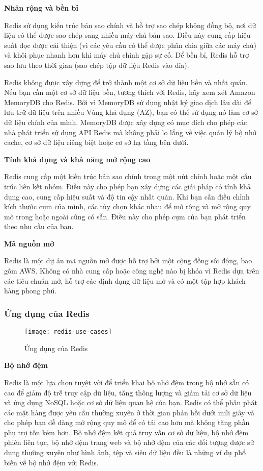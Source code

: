 \textbf{Nhân rộng và bền bỉ}

Redis sử dụng kiến trúc bản sao chính và hỗ trợ sao chép không đồng bộ, nơi dữ liệu có thể được sao chép sang nhiều máy chủ bản sao. Điều này cung cấp hiệu suất đọc được cải thiện (vì các yêu cầu có thể được phân chia giữa các máy chủ) và khôi phục nhanh hơn khi máy chủ chính gặp sự cố. Để bền bỉ, Redis hỗ trợ sao lưu theo thời gian (sao chép tập dữ liệu Redis vào đĩa).

Redis không được xây dựng để trở thành một cơ sở dữ liệu bền và nhất quán. Nếu bạn cần một cơ sở dữ liệu bền, tương thích với Redis, hãy xem xét Amazon MemoryDB cho Redis. Bởi vì MemoryDB sử dụng nhật ký giao dịch lâu dài để lưu trữ dữ liệu trên nhiều Vùng khả dụng (AZ), bạn có thể sử dụng nó làm cơ sở dữ liệu chính của mình. MemoryDB được xây dựng có mục đích cho phép các nhà phát triển sử dụng API Redis mà không phải lo lắng về việc quản lý bộ nhớ cache, cơ sở dữ liệu riêng biệt hoặc cơ sở hạ tầng bên dưới.

\textbf{Tính khả dụng và khả năng mở rộng cao}

Redis cung cấp một kiến trúc bản sao chính trong một nút chính hoặc một cấu trúc liên kết nhóm. Điều này cho phép bạn xây dựng các giải pháp có tính khả dụng cao, cung cấp hiệu suất và độ tin cậy nhất quán. Khi bạn cần điều chỉnh kích thước cụm của mình, các tùy chọn khác nhau để mở rộng và mở rộng quy mô trong hoặc ngoài cũng có sẵn. Điều này cho phép cụm của bạn phát triển theo nhu cầu của bạn.

\textbf{Mã nguồn mở}

Redis là một dự án mã nguồn mở được hỗ trợ bởi một cộng đồng sôi động, bao gồm AWS. Không có nhà cung cấp hoặc công nghệ nào bị khóa vì Redis dựa trên các tiêu chuẩn mở, hỗ trợ các định dạng dữ liệu mở và có một tập hợp khách hàng phong phú.

\subsubsection{Ứng dụng của Redis}

\begin{figure}[H]
	\centering
	\texttt{[image: redis-use-cases]}
	\caption{Ứng dụng của Redis}
\end{figure}

\textbf{Bộ nhớ đệm}

Redis là một lựa chọn tuyệt vời để triển khai bộ nhớ đệm trong bộ nhớ sẵn có cao để giảm độ trễ truy cập dữ liệu, tăng thông lượng và giảm tải cơ sở dữ liệu và ứng dụng NoSQL hoặc cơ sở dữ liệu quan hệ của bạn. Redis có thể phân phát các mặt hàng được yêu cầu thường xuyên ở thời gian phản hồi dưới mili giây và cho phép bạn dễ dàng mở rộng quy mô để có tải cao hơn mà không tăng phần phụ trợ tốn kém hơn. Bộ nhớ đệm kết quả truy vấn cơ sở dữ liệu, bộ nhớ đệm phiên liên tục, bộ nhớ đệm trang web và bộ nhớ đệm của các đối tượng được sử dụng thường xuyên như hình ảnh, tệp và siêu dữ liệu đều là những ví dụ phổ biến về bộ nhớ đệm với Redis.

